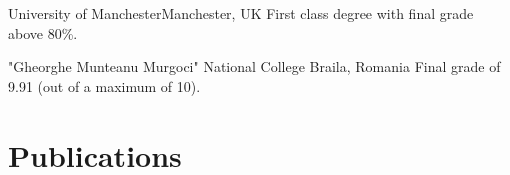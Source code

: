 \documentclass[10pt,a4paper,roman]{moderncv} %
\begin{document}
        {University of Manchester}{Manchester, UK}{}
        {
          First class degree with final grade above 80\%.
        }
  
        {"Gheorghe Munteanu Murgoci" National College}
        {Braila, Romania}{}
        {Final grade of 9.91 (out of a maximum of 10).}


\section{Publications}

\end{document}
